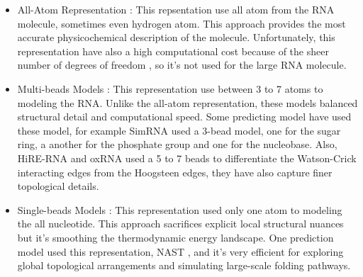 \documentclass[11pt,a4paper]{article}
\begin{document}
\begin{itemize}
    \item All-Atom Representation : This repsentation use all atom from the RNA molecule, sometimes even hydrogen atom. This approach provides the most accurate physicochemical description of the molecule. Unfortunately, this representation have also a high computational cost because of the sheer number of degrees of freedom \cite{sponer_rna_2018}, so it's not used for the large RNA molecule. 
    \item Multi-beads Models : This representation use between 3 to 7 atoms to modeling the RNA. Unlike the all-atom representation, these models balanced structural detail and computational speed. Some predicting model have used these model, for example SimRNA \cite{10.1093/nar/gkv1479} used a 3-bead model, one for the sugar ring, a another for the phosphate group and one for the nucleobase. Also, HiRE-RNA \cite{10.1021/jp102497y} and oxRNA \cite{10.1063/1.4881424} used a 5 to 7 beads to differentiate the Watson-Crick interacting edges from the Hoogsteen edges, they have also capture finer topological details. 
    \item Single-beads Models : This representation used only one atom to modeling the all nucleotide. This approach sacrifices explicit local structural nuances but it's smoothing the thermodynamic energy landscape. One prediction model used this representation, NAST \cite{jonikas_coarse-grained_2009}, and it's very efficient for exploring global topological arrangements and simulating large-scale folding pathways.
\end{itemize}
\end{document}
